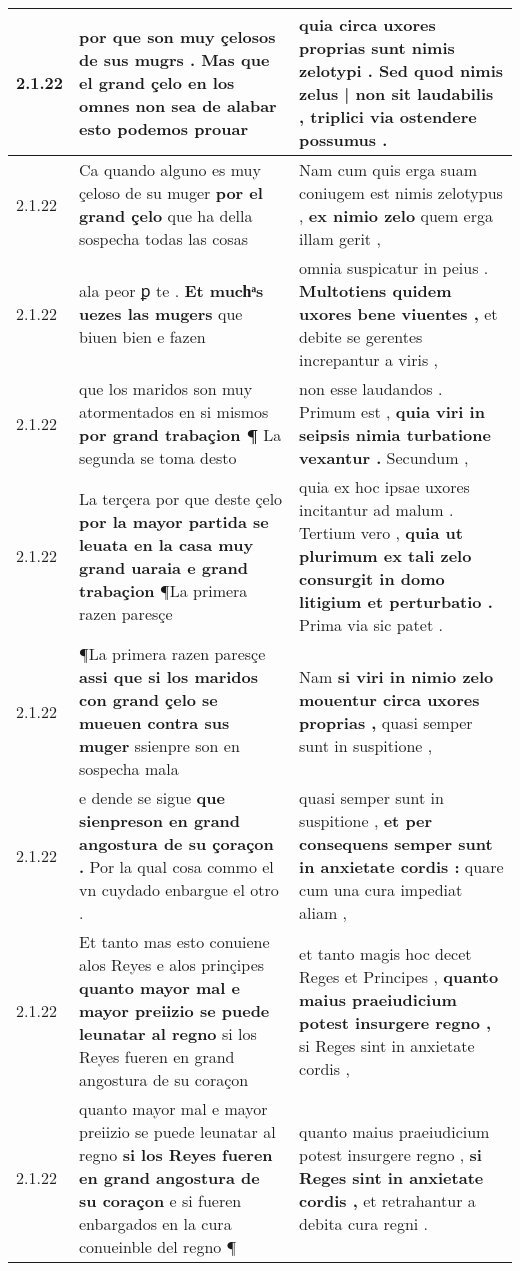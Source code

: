 \begin{tabular}{|p{1cm}|p{6.5cm}|p{6.5cm}|}
2.1.22 & por que son muy çelosos de sus mugrs . \textbf{ Mas que el grand çelo en los omnes non sea de alabar } esto podemos prouar & quia circa uxores proprias sunt nimis zelotypi . \textbf{ Sed quod nimis zelus | non sit laudabilis , } triplici via ostendere possumus . \\\hline
2.1.22 & Ca quando alguno es muy çeloso de su muger \textbf{ por el grand çelo } que ha della sospecha todas las cosas & Nam cum quis erga suam coniugem est nimis zelotypus , \textbf{ ex nimio zelo } quem erga illam gerit , \\\hline
2.1.22 & ala peor ꝑ te . \textbf{ Et muchͣs uezes las mugers } que biuen bien e fazen & omnia suspicatur in peius . \textbf{ Multotiens quidem uxores bene viuentes , } et debite se gerentes increpantur a viris , \\\hline
2.1.22 & que los maridos son muy atormentados en si mismos \textbf{ por grand trabaçion ¶ } La segunda se toma desto & non esse laudandos . Primum est , \textbf{ quia viri in seipsis nimia turbatione vexantur . } Secundum , \\\hline
2.1.22 & La terçera por que deste çelo \textbf{ por la mayor partida se leuata en la casa muy grand uaraia e grand trabaçion } ¶La primera razen paresçe & quia ex hoc ipsae uxores incitantur ad malum . Tertium vero , \textbf{ quia ut plurimum ex tali zelo consurgit in domo litigium et perturbatio . } Prima via sic patet . \\\hline
2.1.22 & ¶La primera razen paresçe \textbf{ assi que si los maridos con grand çelo se mueuen contra sus muger } ssienpre son en sospecha mala & Nam \textbf{ si viri in nimio zelo mouentur circa uxores proprias , } quasi semper sunt in suspitione , \\\hline
2.1.22 & e dende se sigue \textbf{ que sienpreson en grand angostura de su çoraçon . } Por la qual cosa commo el vn cuydado enbargue el otro . & quasi semper sunt in suspitione , \textbf{ et per consequens semper sunt in anxietate cordis : } quare cum una cura impediat aliam , \\\hline
2.1.22 & Et tanto mas esto conuiene alos Reyes e alos prinçipes \textbf{ quanto mayor mal e mayor preiizio se puede leunatar al regno } si los Reyes fueren en grand angostura de su coraçon & et tanto magis hoc decet Reges et Principes , \textbf{ quanto maius praeiudicium potest insurgere regno , } si Reges sint in anxietate cordis , \\\hline
2.1.22 & quanto mayor mal e mayor preiizio se puede leunatar al regno \textbf{ si los Reyes fueren en grand angostura de su coraçon } e si fueren enbargados en la cura conueinble del regno ¶ & quanto maius praeiudicium potest insurgere regno , \textbf{ si Reges sint in anxietate cordis , } et retrahantur a debita cura regni . \\\hline

\end{tabular}
